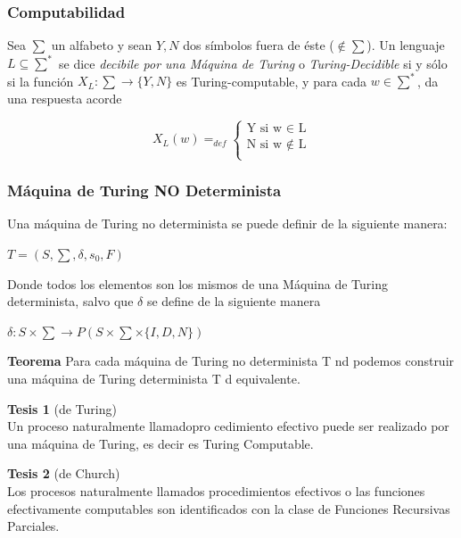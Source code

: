 \documentclass{beamer}                  %
\begin{document}
    \begin{frame}
        \frametitle{Computabilidad}

        Sea $\sum$ un alfabeto y sean $Y,N$ dos símbolos fuera de éste ($\notin \sum$). Un lenguaje $L \subseteq \sum^{*}$ se dice \textit{decibile por una Máquina de Turing} o \textit{Turing-Decidible} si y sólo si la función $X_{L}: \sum \rightarrow \{Y, N\}$ es Turing-computable, y para cada $w \in \sum^{*}$, da una respuesta acorde

        \begin{equation}
            X_{L}(w)=_{def}
            \begin{cases}
                \text{Y si w $\in$ L}\\

                \text{N si w $\notin$ L}\\
            \end{cases}
        \end{equation}
        
    \end{frame}
    \begin{frame}
        \frametitle{Máquina de Turing NO Determinista}
        
        Una máquina de Turing no determinista se puede definir de la siguiente manera:

        \bigskip

        $T=(S,\sum,\delta,s_{0},F)$ 

        \bigskip

        Donde todos los elementos son los mismos de una Máquina de Turing determinista, salvo que $\delta$ se define de la siguiente manera

        \bigskip

        $\delta : S\times \sum \rightarrow P(S\times\sum\times\{I, D ,N\})$

    \end{frame}
    \begin{frame}

    \textbf{Teorema}
    Para cada máquina de Turing no determinista T nd podemos construir una máquina de Turing determinista T d equivalente.

    \end{frame}
    \begin{frame}

    \textbf{Tesis 1} (de Turing)\\
    
    Un proceso naturalmente llamadopro cedimiento efectivo puede ser realizado por una máquina de Turing, es decir es Turing Computable.

    \bigskip

    \textbf{Tesis 2} (de Church)\\
    Los procesos naturalmente llamados procedimientos efectivos o las funciones efectivamente computables son identificados con la clase de Funciones Recursivas Parciales.

    \end{frame}
\end{document}
